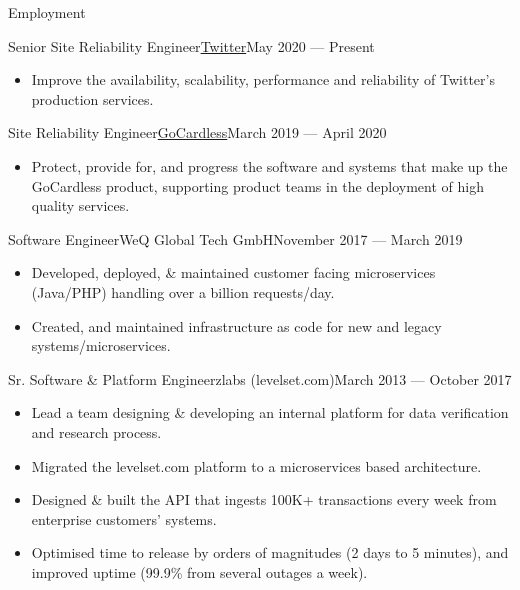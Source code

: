 \documentclass[]{mosabcv}
\begin{document}
\makeheader{}

\begin{cvsection}{Employment}
  \begin{cvsubsection}{Senior Site Reliability
    Engineer}{\href{https://twitter.com}{Twitter}}{May 2020 ---
    Present}
    \begin{itemize}
      \item Improve the availability, scalability, performance and reliability
        of Twitter’s production services.
    \end{itemize}
  \end{cvsubsection}

  \begin{cvsubsection}{Site Reliability
    Engineer}{\href{https://gocardless.com}{GoCardless}}{March 2019 ---
    April 2020}
    \begin{itemize}
      \item Protect, provide for, and progress the software and systems that
        make up the GoCardless product, supporting product teams in the
        deployment of high quality services.
    \end{itemize}

  \end{cvsubsection}

  \begin{cvsubsection}{Software Engineer}{WeQ Global Tech GmbH}{November 2017 ---
    March 2019}    \begin{itemize}
      \item Developed, deployed, \& maintained customer facing microservices
        (Java/PHP) handling over a billion requests/day.
      \item Created, and maintained infrastructure as code for new and legacy
        systems/microservices.
    \end{itemize}
  \end{cvsubsection}

  \begin{cvsubsection}{Sr. Software \& Platform Engineer}{zlabs
    (levelset.com)}{March 2013 --- October 2017}
    \begin{itemize}
      \item Lead a team designing \& developing an internal platform for data
        verification and research process.
      \item Migrated the levelset.com platform to a microservices based
        architecture.
      \item Designed \& built the API that ingests 100K+ transactions
        every week from enterprise customers' systems.
      \item Optimised time to release by orders of magnitudes (2 days to 5
        minutes), and improved uptime (99.9\% from several outages a week).
    \end{itemize}
  \end{cvsubsection}


\end{cvsection}
\end{document}
